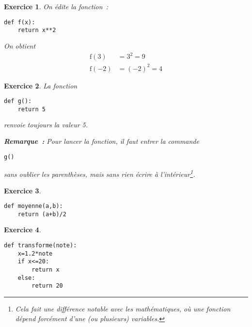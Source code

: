 \documentclass[10pt]{article}
\newtheorem{exo}{Exercice}
\begin{document}
\begin{exo}

On édite la fonction~:

\begin{lstlisting}
def f(x):
	return x**2
\end{lstlisting}



\medskip

On obtient \begin{align*}
\text{f}(3)&=3^2=9\\
\text{f}(-2)&=(-2)^2=4
\end{align*}


\end{exo}

\begin{exo}

La fonction

\begin{lstlisting}
def g():
	return 5
\end{lstlisting}

\medskip

renvoie toujours la valeur 5.

\medskip

\textbf{Remarque~:} Pour lancer la fonction, il faut entrer la commande \begin{lstlisting}
g()
\end{lstlisting} sans oublier les parenthèses, mais sans rien écrire à l'intérieur\footnote{Cela fait une différence notable avec les mathématiques,  où une fonction dépend forcément d'une (ou plusieurs) variables.}.


\end{exo}



\begin{exo}

~{}

\begin{lstlisting}
def moyenne(a,b):
	return (a+b)/2
\end{lstlisting}


 \end{exo}
 
 
 \begin{exo}
 
 ~{}
 
 \begin{lstlisting}
def transforme(note):
	x=1.2*note
	if x<=20:
		return x
	else:
		return 20
\end{lstlisting}


 
 \end{exo}
 
\end{document}
